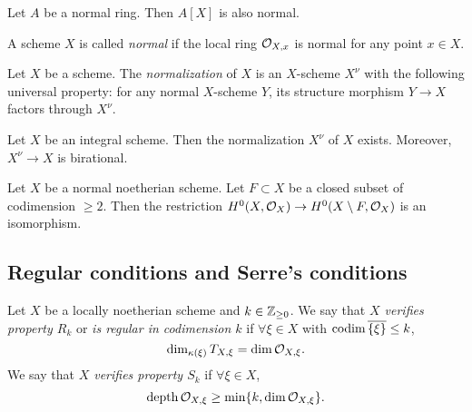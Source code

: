     \begin{proposition}
        Let $A$ be a normal ring.
        Then $A[X]$ is also normal.
    \end{proposition}

    \begin{definition}
        A scheme $X$ is called \textit{normal} if the local ring $\mathcal{O}_{X,x}$ is normal for any point $x\in X$.
    \end{definition}

    \begin{example}
        
    \end{example}

    \begin{definition}
        Let $X$ be a scheme.
        The \textit{normalization} of $X$ is an $X$-scheme $X^\nu$ with the following universal property:
        for any normal $X$-scheme $Y$, its structure morphism $Y \to X$ factors through $X^\nu$.
    \end{definition}

    \begin{proposition}
        Let $X$ be an integral scheme.
        Then the normalization $X^\nu$ of $X$ exists.
        Moreover, $X^\nu \to X$ is birational.
    \end{proposition}

    \begin{theorem}
        Let $X$ be a normal noetherian scheme.
        Let $F \subset X$ be a closed subset of codimension $\geq 2$.
        Then the restriction $H^0(X,\mathcal{O}_X) \to H^0(X\setminus F, \mathcal{O}_{X})$ is an isomorphism.
    \end{theorem}


    
\subsection{Regular conditions and Serre's conditions}

    \begin{definition}
        Let $X$ be a locally noetherian scheme and $k \in \mathbb{Z}_{\geq 0}$.
        We say that \textit{$X$ verifies property $R_k$} or \textit{is regular in codimension $k$} if $\forall \xi \in X$ with $\operatorname{codim} \overline{\{\xi\}} \leq k$, 
        \[ \dim_{\kappa(\xi)} T_{X,\xi} = \dim \mathcal{O}_{X,\xi}. \]
        We say that \textit{$X$ verifies property $S_k$} if $\forall \xi \in X$,
        \[ \operatorname{depth} \mathcal{O}_{X,\xi} \geq \min\{k, \dim \mathcal{O}_{X,\xi}\}. \]        
    \end{definition}

